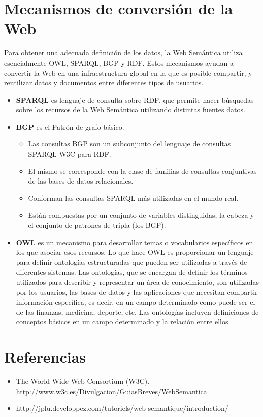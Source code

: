 \documentclass[10pt,a4paper]{article}
\begin{document}
\section{Mecanismos de conversión de la Web}
Para obtener una adecuada definición de los datos, la Web Semántica utiliza esencialmente OWL, SPARQL, BGP y RDF. Estos mecanismos ayudan a convertir la Web en una infraestructura global en la que es posible compartir, y reutilizar datos y documentos entre diferentes tipos de usuarios.
\begin{itemize}
\item \textbf{SPARQL} es lenguaje de consulta sobre RDF, que permite hacer búsquedas sobre los recursos de la Web Semántica utilizando distintas fuentes datos.
\item \textbf{BGP} es el Patrón de grafo básico.
\begin{itemize}
\item Las consultas BGP son un subconjunto del lenguaje de consultas SPARQL W3C para RDF. 
\item El mismo se corresponde con la clase de familias de consultas conjuntivas de las bases de datos relacionales. 
\item Conforman las consultas SPARQL más utilizadas en el mundo real.
\item Están compuestas por un conjunto de variables distinguidas, la cabeza y el conjunto de patrones de tripla (los BGP).
\end{itemize}

\item \textbf{OWL} es un mecanismo para desarrollar temas o vocabularios específicos en los que asociar esos recursos. Lo que hace OWL es proporcionar un lenguaje para definir ontologías estructuradas que pueden ser utilizadas a través de diferentes sistemas. Las ontologías, que se encargan de definir los términos utilizados para describir y representar un área de conocimiento, son utilizadas por los usuarios, las bases de datos y las aplicaciones que necesitan compartir información específica, es decir, en un campo determinado como puede ser el de las finanzas, medicina, deporte, etc. Las ontologías incluyen definiciones de conceptos básicos en un campo determinado y la relación entre ellos.
\end{itemize}

\newpage

\section{Referencias}

\begin{itemize}
\item The World Wide Web Consortium (W3C). http://www.w3c.es/Divulgacion/GuiasBreves/WebSemantica
\item http://jplu.developpez.com/tutoriels/web-semantique/introduction/
\end{itemize}
\end{document}
